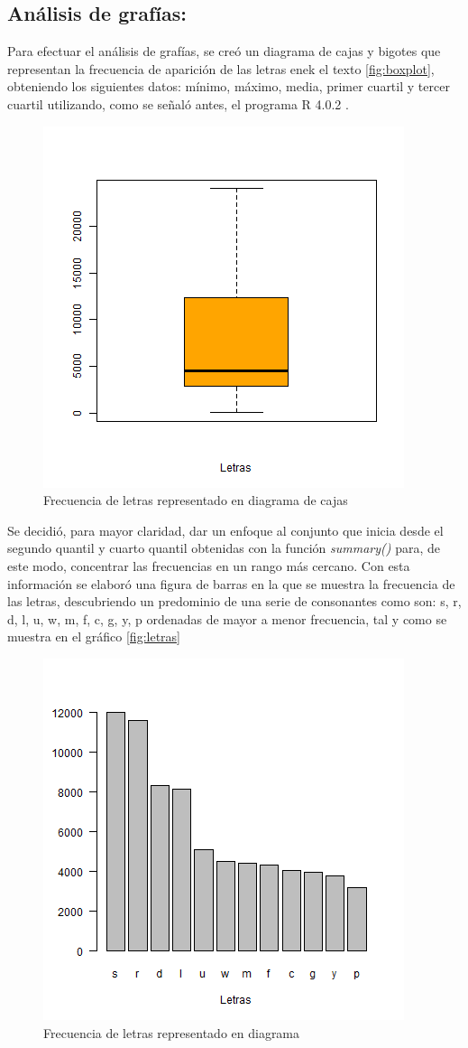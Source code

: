 \documentclass[]{article}
\begin{document}
\subsection{Análisis de grafías:}
Para efectuar el análisis de grafías, se creó un diagrama de cajas y bigotes que representan la frecuencia de aparición de las letras enek el texto \autoref{fig:boxplot}, obteniendo los siguientes datos: mínimo, máximo, media, primer cuartil y tercer cuartil utilizando, como se señaló antes, el programa R 4.0.2  \cite{rproject}. 

\begin{figure}[b]
    \centering
    \includegraphics[width=.5\linewidth]{boxplot.png}    \caption{Frecuencia de letras representado en diagrama de cajas}
    \label{fig:boxplot}
\end{figure}

Se decidió, para mayor claridad, dar un enfoque al conjunto que inicia desde el segundo quantil y cuarto quantil obtenidas con la función \textit{summary()} para, de este modo, concentrar las frecuencias en un rango más cercano. 
 Con esta información se elaboró una figura de barras en la que se muestra la frecuencia de las letras, descubriendo un predominio de una serie de consonantes como son: s, r, d, l, u, w, m, f, c, g, y, p ordenadas de mayor a menor frecuencia, tal y como se muestra en el gráfico 
\autoref{fig:letras}
\begin{figure}[b]
    \centering
    \includegraphics[width=.5\linewidth]{Letras.png}    \caption{Frecuencia de letras representado en diagrama}
    \label{fig:letras}
\end{figure}
\end{document}
